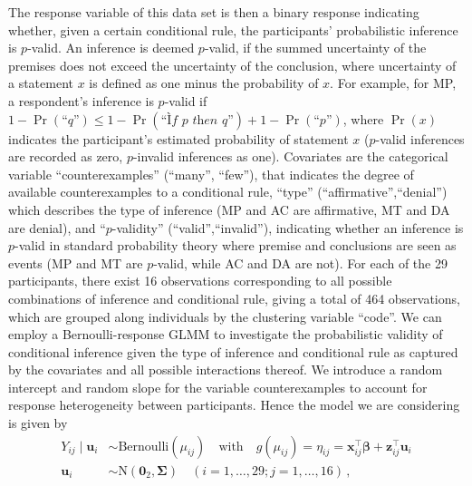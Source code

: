 \documentclass[11pt, a4paper]{article}
\newcommand*{\bb}{\boldsymbol}
\theoremstyle{example} \newtheorem{example}{Example}[section]
\theoremstyle{theorem} \newtheorem{theorem}{Theorem}[section]
\def\bbeta{\bb{\beta}}
\def\bu{\bb{u}}
\def\bx{\bb{x}}
\def\bz{\bb{z}}
\def\b0{\bb{0}}
\begin{document}
The response variable of this data set is then a binary response indicating whether, given a certain conditional rule, the participants' probabilistic inference is $p$-valid. An inference is deemed $p$-valid, if the summed uncertainty of the premises does not exceed the uncertainty of the conclusion, where uncertainty of a statement $x$ is defined as one minus the probability of $x$. For example, for MP, a respondent's inference is $p$-valid if $1-\Pr(\textit{``q''}) \leq 1 - \Pr(\textit{``Ìf p then q''}) + 1-\Pr(\textit{``p''}) $, where $\Pr(x)$ indicates the participant's estimated probability of statement $x$ ($p$-valid inferences are recorded as zero, $p$-invalid inferences as one). Covariates are the categorical variable ``counterexamples'' (``many'', ``few''), that indicates the degree of available counterexamples to a conditional rule, ``type'' (``affirmative'',``denial'') which describes the type of inference (MP and AC are affirmative, MT and DA are denial), and ``$p$-validity'' (``valid'',``invalid''), indicating whether an inference is $p$-valid in standard probability theory where premise and conclusions are seen as events (MP and MT are $p$-valid, while AC and DA are not). For each of the 29 participants, there exist 16 observations corresponding to all possible combinations of inference and conditional rule, giving a total of 464 observations, which are grouped along individuals by the clustering variable ``code''. We can employ a Bernoulli-response GLMM to investigate the probabilistic validity of conditional inference given the type of inference and conditional rule as captured by the covariates and all possible interactions thereof. We introduce a random intercept and random slope for the variable counterexamples to account for response heterogeneity between participants. Hence the model we are considering is given by    
\begin{align}
  \label{eq:cond_inf_model} 
  Y_{ij} \mid \bb{u}_i & \sim \text{Bernoulli}(\mu_{ij}) \quad \text{with} \quad
                         g(\mu_{ij}) = \eta_{ij} = \bx_{ij}^\top \bbeta + \bz_{ij}^\top \bu_i\\
  \bu_i & \sim \text{N}(\b0_2, \bb{\Sigma})  \quad (i = 1, \ldots, 29; j = 1, \ldots, 16)\,,
\end{align}
\end{document}
